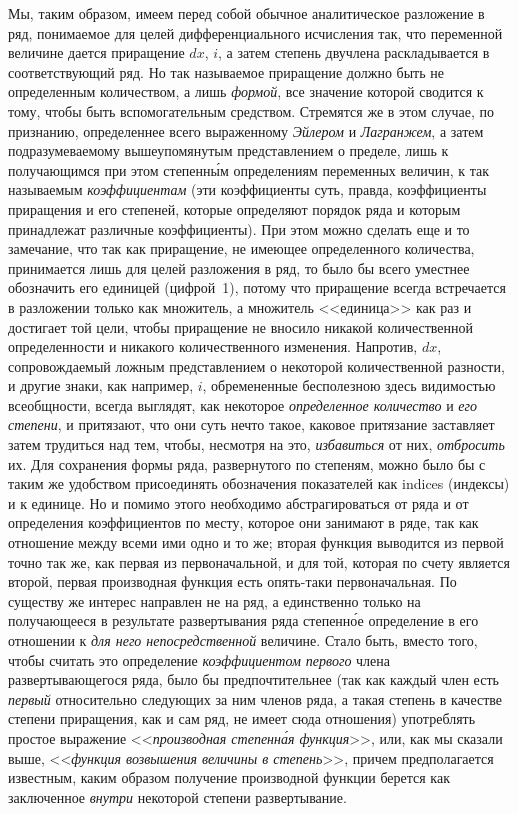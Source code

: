 Мы, таким образом, имеем перед собой обычное аналитическое разложение в ряд,
понимаемое для целей дифференциального исчисления так, что переменной величине
дается приращение $dx$, $i$, а затем степень двучлена раскладывается в
соответствующий ряд. Но так называемое приращение должно быть не определенным
количеством, а лишь {\em формой}, все значение которой сводится к тому, чтобы
быть вспомогательным средством. Стремятся же в этом случае, по признанию,
определеннее всего выраженному {\em Эйлером} и {\em Лагранжем}, а затем
подразумеваемому вышеупомянутым представлением о пределе, лишь к получающимся
при этом степенн\'{ы}м определениям переменных величин, к так называемым
{\em коэффициентам} (эти коэффициенты суть, правда, коэффициенты приращения и
его степеней, которые определяют порядок ряда и которым принадлежат различные
коэффициенты). При этом можно сделать еще и то замечание, что так как
приращение, не имеющее определенного количества, принимается лишь для целей
разложения в ряд, то было бы всего уместнее обозначить его единицей (цифрой~1),
потому что приращение всегда встречается в разложении только как множитель, а
множитель <<единица>> как раз и достигает той цели, чтобы приращение не вносило
никакой количественной определенности и никакого количественного изменения.
Напротив, $dx$, сопровождаемый ложным представлением о некоторой количественной
разности, и другие знаки, как например, $i$, обремененные бесполезною здесь
видимостью всеобщности, всегда выглядят, как некоторое
{\em определенное количество} и {\em его степени}, и притязают, что они суть
нечто такое, каковое притязание заставляет затем трудиться над тем, чтобы,
несмотря на это, {\em избавиться} от них, {\em отбросить} их. Для сохранения
формы ряда, развернутого по степеням, можно было бы с таким же удобством
присоединять обозначения показателей как indices (индексы) и к единице. Но и
помимо этого необходимо абстрагироваться от ряда и от определения коэффициентов
по месту, которое они занимают в ряде, так как отношение между всеми ими одно и
то же; вторая функция выводится из первой точно так же, как первая из
первоначальной, и для той, которая по счету является второй, первая производная
функция есть опять-таки первоначальная. По существу же интерес направлен не на
ряд, а единственно только на получающееся в результате развертывания ряда
степенн\'{о}е определение в его отношении к {\em для него непосредственной}
величине. Стало быть, вместо того, чтобы считать это определение
{\em коэффициентом первого} члена развертывающегося ряда, было бы
предпочтительнее (так как каждый член есть {\em первый} относительно следующих
за ним членов ряда, а такая степень в качестве степени приращения, как и сам
ряд, не имеет сюда отношения) употреблять простое выражение <<{\em производная
степенн\'{а}я функция}>>, или, как мы сказали выше, <<{\em функция возвышения
величины в степень}>>, причем предполагается известным, каким образом получение
производной функции берется как заключенное {\em внутри} некоторой степени
развертывание.

